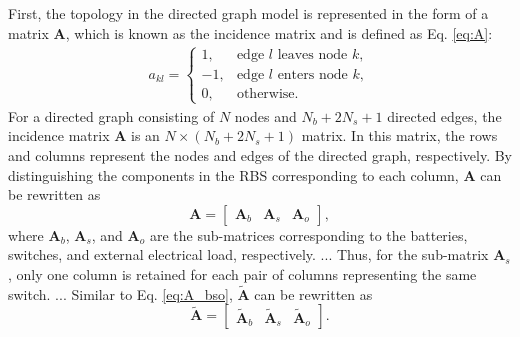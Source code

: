 \documentclass[a4paper]{article}
\begin{document}
First, the topology in the directed graph model is represented in the form of a matrix $\boldsymbol{A}$, which is known as the incidence matrix and is defined as Eq. \eqref{eq:A}:
\begin{align}\label{eq:A}
    a_{kl}=
    \begin{cases}
        1,  & \text{edge $l$ leaves node $k$},\\
        -1, & \text{edge $l$ enters node $k$},\\
        0,  & \text{otherwise}.
    \end{cases}
\end{align}
For a directed graph consisting of $N$ nodes and $N_b+2N_s+1$ directed edges, the incidence matrix $\boldsymbol{A}$ is an $N\times(N_b+2N_s+1)$ matrix. 
In this matrix, the rows and columns represent the nodes and edges of the directed graph, respectively.
By distinguishing the components in the RBS corresponding to each column, $\boldsymbol{A}$ can be rewritten as
\begin{equation}\label{eq:A_bso}
    \boldsymbol{A} =
    \begin{bmatrix}
        \boldsymbol{A}_b & \boldsymbol{A}_s & \boldsymbol{A}_o
    \end{bmatrix},
\end{equation}
where $\boldsymbol{A}_b$, $\boldsymbol{A}_s$, and $\boldsymbol{A}_o$ are the sub-matrices corresponding to the batteries, switches, and external electrical load, respectively.
...
Thus, for the sub-matrix $\boldsymbol{A}_s$, only one column is retained for each pair of columns representing the same switch.
...
Similar to Eq. \eqref{eq:A_bso}, $\boldsymbol{\tilde{A}}$ can be rewritten as
\begin{equation}\label{eq:A_bso_tilde}
    \boldsymbol{\tilde{A}} =
    \begin{bmatrix}
        \boldsymbol{\tilde{A}}_b & \boldsymbol{\tilde{A}}_s & \boldsymbol{\tilde{A}}_o
    \end{bmatrix}.
\end{equation}



\end{document}

